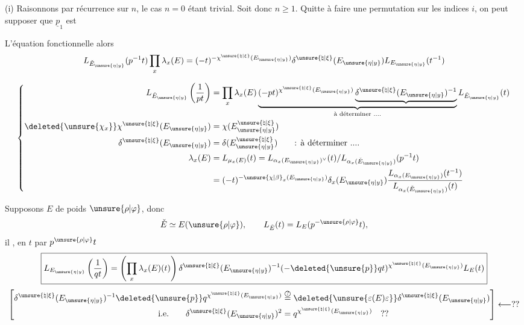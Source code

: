 (i) Raisonnons par récurrence sur $n$, le cas $n=0$ étant trivial. Soit donc $n\ge1$. Quitte à faire une permutation sur les indices $i$, on peut supposer que $\underline{p}_1$ est

L'équation fonctionnelle  alors
\[
L_{\check E_{\unsure{\eta|y}}}(p^{-1}t)\prod_x\lambda_x(E)=(-t)^{-\chi^{\unsure{\natural|\xi}}(E_{\unsure{\eta|y}})}\delta^{\unsure{\natural|\xi}}(E_{\unsure{\eta|y}})L_{E_{\unsure{\eta|y}}}(t^{-1})
\]

\[
\left\{\begin{aligned}
L_{\check E_{\unsure{\eta|y}}}\left(\frac1{pt}\right)&=\prod_x\lambda_x(E)\underbrace{(-pt)^{\chi^{\unsure{\natural|\xi}}(E_{\unsure{\eta|y}})}\underbrace{\delta^{\unsure{\natural|\xi}}(E_{\unsure{\eta|y}})^{-1}}}_{\text{à déterminer ....}}L_{\check E_{\unsure{\eta|y}}}(t)\\
\deleted{\unsure{\chi_x}}\chi^{\unsure{\natural|\xi}}(E_{\unsure{\eta|y}})&=\chi(E_{\unsure{\eta|y}}^{\unsure{\natural|\xi}})\\
\delta^{\unsure{\natural|\xi}}(E_{\unsure{\eta|y}})&=\delta(E_{\unsure{\eta|y}}^{\unsure{\natural|\xi}})\qquad\text{: à déterminer ....}\\
\lambda_x(E)&=L_{\mu_x(E)}(t)=L_{\alpha_x(E_{\unsure{\eta|y}})^\vee}(t)/L_{\alpha_x(\check E_{\unsure{\eta|y}})}(p^{-1}t)\\
&=(-t)^{-\unsure{\chi|\beta}_x(E_{\unsure{\eta|y}})}\delta_x(E_{\unsure{\eta|y}})\frac{L_{\alpha_x(E_{\unsure{\eta|y}})}(t^{-1})}{L_{\alpha_x(\check E_{\unsure{\eta|y}})}(t)}
\end{aligned}\right.
\]

Supposons $E$ de poids $\unsure{\rho|\varphi}$, donc
\[
\check E\simeq E(\unsure{\rho|\varphi}),\qquad L_{\check E}(t)=L_E(p^{-\unsure{\rho|\varphi}}t),
\]
il , en  $t$ par $p^{\unsure{\rho|\varphi}}t$
\[
\boxed{L_{E_{\unsure{\eta|y}}}\left(\frac1{qt}\right)=\left(\prod_x\lambda_x(E)(t)\right)\delta^{\unsure{\natural|\xi}}(E_{\unsure{\eta|y}})^{-1}(-\deleted{\unsure{p}}qt)^{\chi^{\unsure{\natural|\xi}}(E_{\unsure{\eta|y}})}L_E(t)}
\]
\[
\left[\begin{aligned}
\delta^{\unsure{\natural|\xi}}(E_{\unsure{\eta|y}})^{-1}\deleted{\unsure{p}}q^{\chi^{\unsure{\natural|\xi}}(E_{\unsure{\eta|y}})}&\overset{\text{\textcircled{?}}}{=}\deleted{\unsure{\varepsilon(E)\varepsilon}}\delta^{\unsure{\natural|\xi}}(E_{\unsure{\eta|y}})\\
\text{i.e.}\qquad \delta^{\unsure{\natural|\xi}}(E_{\unsure{\eta|y}})^2&=q^{\chi^{\unsure{\natural|\xi}}(E_{\unsure{\eta|y}})}\quad ??
\end{aligned}\right]\longleftarrow ??
\]

